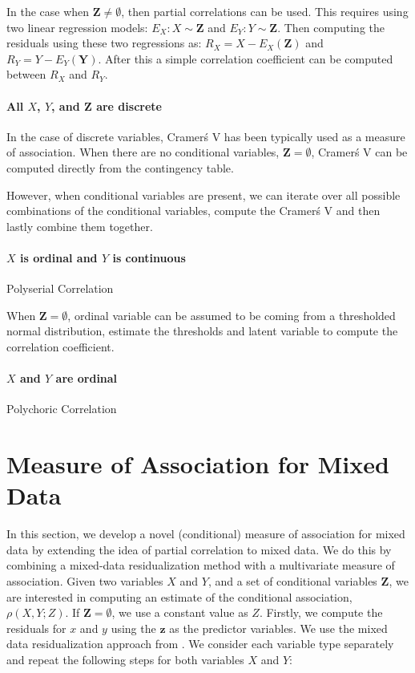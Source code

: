 \documentclass[letterpaper]{article} %
\begin{document}
In the case when $ \bm{Z} \neq \emptyset $, then partial correlations can be
used. This requires using two linear regression models: $ E_X: X \sim \bm{Z} $
and $ E_Y: Y \sim \bm{Z} $. Then computing the residuals using these two
regressions as: $ R_X = X - E_X(\bm{Z}) $ and $ R_Y = Y - E_Y(\bm{Y}) $. After
this a simple correlation coefficient can be computed between $ R_X $ and $ R_Y $.

\paragraph{All $ X $, $ Y $, and $ \bm{Z} $ are discrete}

In the case of discrete variables, Cramer\'s V has been typically used as a
measure of association. When there are no conditional variables, $ \bm{Z} = \emptyset $,
Cramer\'s V can be computed directly from the contingency table.

However, when conditional variables are present, we can iterate over all
possible combinations of the conditional variables, compute the Cramer\'s V and
then lastly combine them together. 


\paragraph{$ X $ is ordinal and $ Y $ is continuous}
Polyserial Correlation

When $ \bm{Z} = \emptyset $, ordinal variable can be assumed to be coming from
a thresholded normal distribution, estimate the thresholds and latent variable
to compute the correlation coefficient.

\paragraph{$ X $ and $ Y $ are ordinal}
Polychoric Correlation

\section{Measure of Association for Mixed Data}
\label{sec:mixed_association}

In this section, we develop a novel (conditional) measure of association for
mixed data by extending the idea of partial correlation to mixed data. We do
this by combining a mixed-data residualization method with a multivariate
measure of association. Given two variables $ X $ and $ Y $, and a set of
conditional variables $ \bm{Z} $, we are interested in computing an estimate of
the conditional association, $ \rho(X, Y; Z) $. If $ \bm{Z} = \emptyset $, we
use a constant value as $ Z $. Firstly, we compute the residuals for $ x $ and
$ y $ using the $ \bm{z} $ as the predictor variables. We use the mixed data
residualization approach from \citet{Ankan2023}. We consider each variable type
separately and repeat the following steps for both variables $ X $ and $ Y $:
\end{document}
